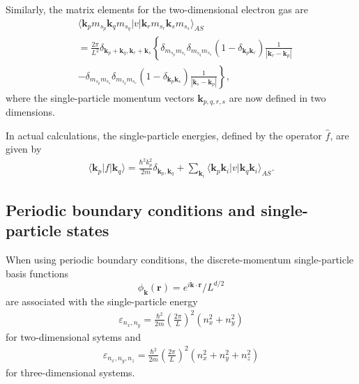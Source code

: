 \documentclass[%
oneside,                 %
final,                   %
10pt]{article}
\begin{document}
Similarly, the matrix elements for the two-dimensional
electron gas are
\begin{align} \label{eq:vmat_2dheg}
  & \langle \mathbf{k}_{p}m_{s_{p}}\mathbf{k}_{q}m_{s_{q}}
  |v|\mathbf{k}_{r}m_{s_{r}}\mathbf{k}_{s}m_{s_{s}}\rangle_{AS} 
  \nonumber \\
  & = \frac{2\pi }{L^{2}}
  \delta_{\mathbf{k}_{p}+\mathbf{k}_{q},\mathbf{k}_{r}+\mathbf{k}_{s}}
  \left\{ \delta_{m_{s_{p}}m_{s_{r}}}\delta_{m_{s_{q}}m_{s_{s}}} 
  \left( 1 - \delta_{\mathbf{k}_{p}\mathbf{k}_{r}}\right)
  \frac{1}{
    |\mathbf{k}_{r}-\mathbf{k}_{p}|} \right.
  \nonumber \\
  & - \left. \delta_{m_{s_{p}}m_{s_{s}}}\delta_{m_{s_{q}}m_{s_{r}}}
  \left( 1 - \delta_{\mathbf{k}_{p}\mathbf{k}_{s}}\right)
  \frac{1}{ 
    |\mathbf{k}_{s}-\mathbf{k}_{p}|}
  \right\} ,
\end{align}
where the single-particle momentum vectors $\mathbf{k}_{p,q,r,s}$
are now defined in two dimensions.

In actual  calculations, the 
single-particle energies, defined by the operator $\hat{f}$, are given by
\begin{align}
  \langle \mathbf{k}_{p}|f|\mathbf{k}_{q} \rangle
  = \frac{\hbar^{2}k_{p}^{2}}{2m}\delta_{\mathbf{k}_{p},
  \mathbf{k}_{q}} + \sum_{\mathbf{k}_{i}}\langle 
  \mathbf{k}_{p}\mathbf{k}_{i}|v|\mathbf{k}_{q}
  \mathbf{k}_{i}\rangle_{AS}.
  \label{eq:fock_heg}
\end{align}



\subsection{Periodic boundary conditions and single-particle states}

When using periodic boundary conditions, the 
discrete-momentum single-particle basis functions 
\[
\phi_{\mathbf{k}}(\mathbf{r}) =
e^{i\mathbf{k}\cdot \mathbf{r}}/L^{d/2}
\]
are associated with 
the single-particle energy   
\begin{align}
  \varepsilon_{n_{x}, n_{y}} = \frac{\hbar^{2}}{2m} \left( \frac{2\pi }{L}\right)^{2}\left( n_{x}^{2} + n_{y}^{2}\right)
\end{align}
for two-dimensional sytems and 
\begin{align}
  \varepsilon_{n_{x}, n_{y}, n_{z}} = \frac{\hbar^{2}}{2m}
  \left( \frac{2\pi }{L}\right)^{2}
  \left( n_{x}^{2} + n_{y}^{2} + n_{z}^{2}\right)
\end{align} 
for three-dimensional systems.
\end{document}
